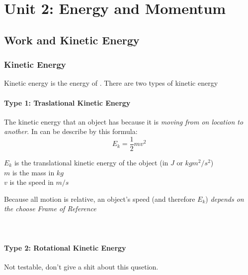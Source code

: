 \chapter{Unit 2: Energy and Momentum}
\section{Work and Kinetic Energy}
\subsection{Kinetic Energy}
\begin{cyanblock}
    \begin{definition}
        Kinetic energy is the energy of . There are two types of kinetic energy
    \end{definition}
\end{cyanblock}

\subsubsection*{Type 1: Traslational Kinetic Energy}
The kinetic energy that an object has because it is \textit{moving from on location to another}. In can be describe by this 
formula:
\begin{equation}
    E_k = \frac{1}{2}mv^2
\end{equation}
\begin{center}
    $E_k$ is the translational kinetic energy of the object (in $J$ or $kgm^2/s^2$)\\
    $m$ is the mass in $kg$\\
    $v$ is the speed in $m/s$
\end{center}

Because all motion is relative, an object's speed (and therefore $E_k$) \textit{depends on the choose Frame of Reference}\\

\\

\\


\subsubsection*{Type 2: Rotational Kinetic Energy}
    Not testable, don't give a shit about this qusetion. 

